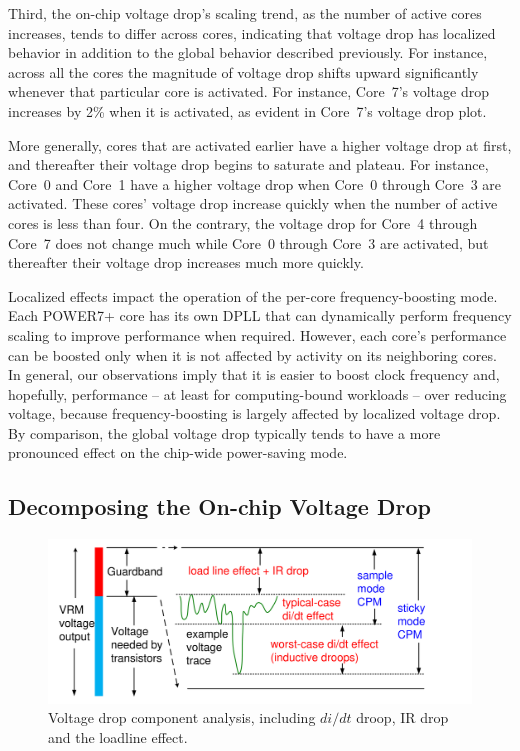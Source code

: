 Third, the on-chip voltage drop's scaling trend, as the number of active cores increases, tends to differ across cores, indicating that voltage drop has localized behavior in addition to the global behavior described previously. For instance, across all the cores the magnitude of voltage drop shifts upward significantly whenever that particular core is activated. For instance, Core~7's voltage drop increases by 2\% when it is activated, as evident in Core~7's voltage drop plot.

More generally, cores that are activated earlier have a higher voltage drop at first, and thereafter their voltage drop begins to saturate and plateau. For instance, Core~0 and Core~1 have a higher voltage drop when Core~0 through Core~3 are activated. These cores' voltage drop increase quickly when the number of active cores is less than four. On the contrary, the voltage drop for Core~4 through Core~7 does not change much while Core~0 through Core~3 are activated, but thereafter their voltage drop increases much more quickly.

Localized effects impact the operation of the per-core frequency-boosting mode. Each POWER7+ core has its own DPLL that can dynamically perform frequency scaling to improve performance when required. However, each core's performance can be boosted only when it is not affected by activity on its neighboring cores. In general, our observations imply that it is easier to boost clock frequency and, hopefully, performance -- at least for computing-bound workloads -- over reducing voltage, because frequency-boosting is largely affected by localized voltage drop. By comparison, the global voltage drop typically tends to have a more pronounced effect on the chip-wide power-saving mode. 

\subsection{Decomposing the On-chip Voltage Drop}
\label{sec:voltage:rootcause:vdrop-decompose}

\begin{figure}
  \centering
  \includegraphics[trim=0 0 0 0,clip,width=0.9\linewidth]{graphs/voltage/noise_components.pdf}
  \captionsetup{width=0.95\textwidth}
  \caption{Voltage drop component analysis, including $di/dt$ droop, IR drop and the loadline effect.}
  \label{fig:vnoise-component} 
\end{figure}

